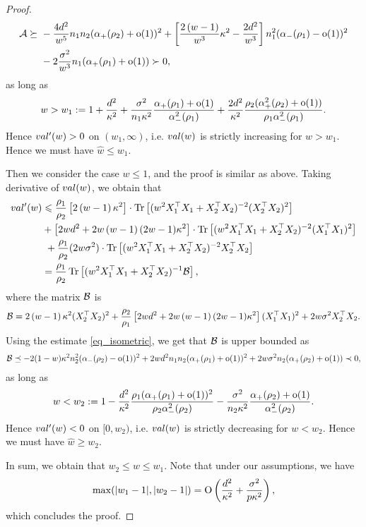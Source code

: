 \begin{proof}
\begin{align*}
\cal A \succeq&~ - \frac{4d^2}{w^5}n_1n_2 (\al_+(\rho_2)+\oo(1))^2 + \left[\frac{2\left( w-1\right)}{w^3}\kappa^2 - \frac{2d^2}{w^3} \right]n_1^2 (\al_-(\rho_1)-\oo(1))^2 \\
&~ - 2 \frac{\sigma^2}{w^3}n_1(\al_{+}(\rho_1)+\oo(1)) \succ 0,
\end{align*}
as long as
$$w> w_1:=1 +\frac{d^2}{\kappa^2}+ \frac{\sigma^2}{n_1\kappa^2}\frac{\al_{+}(\rho_1)+\oo(1)}{\al_{-}^2(\rho_1)} + \frac{2d^2}{\kappa^2}\frac{\rho_2(\al_+^2(\rho_2)+\oo(1))}{\rho_1\al_-^2(\rho_1) }.$$
Hence $\val'(w)>0$ on $(w_1,\infty)$, i.e. $\val(w)$ is strictly increasing for $w>w_1$. Hence we must have $\hat w\le w_1$. 

Then we consider the case $w\le 1$, and the proof is similar as above. Taking derivative of $\val(w)$, we obtain that
\begin{align}
	\val'(w) &\le \frac{\rho_1}{\rho_2} \left[2\left( w-1\right) \kappa^2\right]\cdot \tr\left[( w^2X_1^{\top}X_1 +X_2^{\top}X_2)^{-2} (X_2^{\top}X_2)^2\right] \nonumber \\
	& +  \left[2wd^2 +2w\left( w-1\right)(2w-1)\kappa^2\right]\cdot \tr\left[( w^2X_1^{\top}X_1 +X_2^{\top}X_2)^{-2} (X_1^{\top}X_1)^2\right] \nonumber\\
	&~ + \frac{\rho_1}{\rho_2}(2 w\sigma^2) \cdot \bigtr{(w^2X_1^{\top}X_1 + X_2^{\top}X_2)^{-2} X_2^\top X_2  }\\
			& = \frac{\rho_1}{\rho_2} \bigtr{(w^2X_1^{\top}X_1  + X_2^{\top}X_2)^{-1} \cal B} , \nonumber
\end{align}
where the matrix $\cal B$ is
$$\cal B= 2\left( w-1\right) \kappa^2  (X_2^{\top}X_2)^2+\frac{\rho_2}{\rho_1}\left[2wd^2 +2w\left( w-1\right)(2w-1)\kappa^2\right](X_1^{\top}X_1)^2 + 2 w\sigma^2 X_2^\top X_2 .$$
Using the estimate \eqref{eq_isometric}, we get that $\cal B$ is upper bounded as
\begin{align*}
\cal B \preceq - 2(1-w)\kappa^2 n_2^2 (\al_-(\rho_2) -\oo(1))^2 +2w d^2 n_1n_2 (\al_+(\rho_1) +\oo(1))^2 + 2w\sigma^2 n_2 (\al_+(\rho_2)+\oo(1)) \prec 0,
\end{align*}
as long as
$$w< w_2:=1 -   \frac{d^2}{\kappa^2}\frac{\rho_1(\al_+(\rho_1) +\oo(1))^2}{\rho_2 \al_-^2(\rho_2) } -  \frac{\sigma^2}{n_2\kappa^2}\frac{\al_{+}(\rho_2)+\oo(1)}{\al_{-}^2(\rho_2)} .$$
Hence $\val'(w)<0$ on $[0,w_2)$, i.e. $\val(w)$ is strictly decreasing for $w<w_2$. Hence we must have $\hat w\ge w_2$. 

In sum, we obtain that $w_2\le w\le w_1$. Note that under our assumptions, we have 
$$\max(|w_1 -1|, |w_2 -1|) =\OO\left(\frac{d^2}{\kappa^2} + \frac{\sigma^2}{p\kappa^2}\right),$$
which concludes the proof.
\end{proof}

